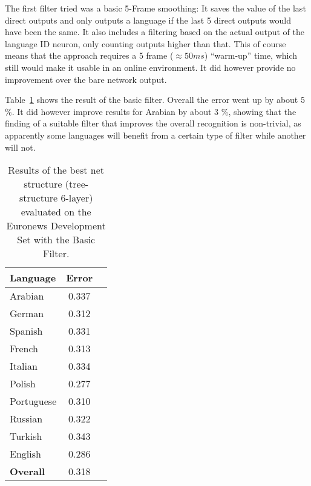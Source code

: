 The first filter tried was a basic 5-Frame smoothing: It saves the value of the last direct outputs and only outputs a language if the last 5 direct outputs would have been the same. It also includes a filtering based on the actual output of the language ID neuron, only counting outputs higher than that. This of course means that the approach requires a 5 frame (\(\approx 50 ms\)) ``warm-up'' time, which still would make it usable in an online environment. It did however provide no improvement over the bare network output.


Table~\ref{tab:basic} shows the result of the basic filter. Overall the error went up by about 5 \%. It did however improve results for Arabian by about 3 \%, showing that the finding of a suitable filter that improves the overall recognition is non-trivial, as apparently some languages will benefit from a certain type of filter while another will not. 

\begin{table}[h!]
\label{tab:basic}
\centering
\begin{tabular}{| l | c | r | }
	\hline
	\textbf{Language} & \textbf{Error}  \\
	\hline
	Arabian & 0.337  \\
	German & 0.312  \\
	Spanish & 0.331 \\ 
	French & 0.313 \\
	Italian & 0.334  \\
	Polish & 0.277 \\
	Portuguese& 0.310  \\
	Russian&  0.322 \\
	Turkish&  0.343 \\
	English&  0.286 \\
	\hline
	\textbf{Overall} & 0.318 \\
	\hline
\end{tabular}
\caption{Results of the best net structure (tree-structure 6-layer) evaluated on the Euronews Development Set with the Basic Filter.}
\end{table}


